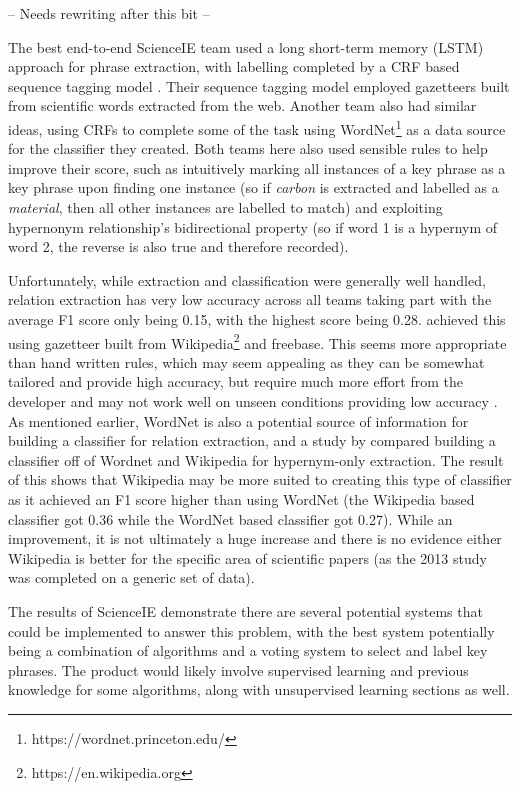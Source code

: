 -- Needs rewriting after this bit --

The best end-to-end ScienceIE team used a long short-term memory (LSTM) approach for phrase extraction, with labelling completed by a CRF based sequence tagging model \cite{Ammar2017}. Their sequence tagging model employed gazetteers built from scientific words extracted from the web. Another team \cite{Marsi2017} also had similar ideas, using CRFs to complete some of the task using WordNet\footnote{https://wordnet.princeton.edu/} as a data source for the classifier they created. Both teams here also used sensible rules to help improve their score, such as intuitively marking all instances of a key phrase as a key phrase upon finding one instance (so if \textit{carbon} is extracted and labelled as a \textit{material}, then all other instances are labelled to match) and exploiting hypernonym relationship’s bidirectional property (so if word 1 is a hypernym of word 2, the reverse is also true and therefore recorded). 

Unfortunately, while extraction and classification were generally well handled, relation extraction has very low accuracy across all teams taking part with the average F1 score only being 0.15, with the highest score being 0.28. \cite{Ammar2017} achieved this using gazetteer built from Wikipedia\footnote{https://en.wikipedia.org} and freebase. This seems more appropriate than hand written rules, which may seem appealing as they can be somewhat tailored and provide high accuracy, but require much more effort from the developer and may not work well on unseen conditions providing low accuracy \cite{Manning2012}. As mentioned earlier, WordNet is also a potential source of information for building a classifier for relation extraction, and a study by \cite{Snow2013} compared building a classifier off of Wordnet and Wikipedia for hypernym-only extraction. The result of this shows that Wikipedia may be more suited to creating this type of classifier as it achieved an F1 score higher than using WordNet (the Wikipedia based classifier got 0.36 while the WordNet based classifier got 0.27). While an improvement, it is not ultimately a huge increase and there is no evidence either Wikipedia is better for the specific area of scientific papers (as the 2013 study was completed on a generic set of data).

The results of ScienceIE demonstrate there are several potential systems that could be implemented to answer this problem, with the best system potentially being a combination of algorithms and a voting system to select and label key phrases. The product would likely involve supervised learning and previous knowledge for some algorithms, along with unsupervised learning sections as well.

